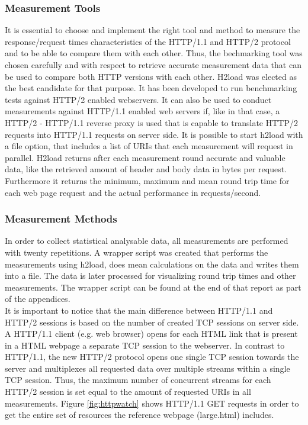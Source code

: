 \subsubsection{Measurement Tools}
It is essential to choose and implement the right tool and method to measure the response/request times characteristics of the HTTP/1.1 and HTTP/2 protocol and to be able to compare them with each other. Thus, the bechmarking tool was chosen carefully and with respect to retrieve accurate measurement data that can be used to compare both HTTP versions with each other. 
H2load \cite{h2load} was elected as the best candidate for that purpose. It has been developed to run benchmarking tests against HTTP/2 enabled webservers. 
It can also be used to conduct measurements against HTTP/1.1 enabled web servers if, like in that case, a HTTP/2 - HTTP/1.1 reverse proxy is used that is capable to translate HTTP/2 requests into HTTP/1.1 requests on server side. 
It is possible to start h2load with a file option, that includes a list of URIs that each measurement will request in parallel. H2load returns after each measurement round accurate and valuable data, like the retrieved  amount of header and body data in bytes per request. Furthermore it returns the minimum, maximum and mean round trip time for each web page request and the actual performance in requests/second. 
\\
\subsubsection{Measurement Methods}
In order to collect statistical analysable data, all measurements are performed with twenty repetitions. A wrapper script was created that performs the measurements using h2load, does mean calculations on the data and writes them into a file. The data is later processed for visualizing round trip times and other measurements. The wrapper script can be found at the end of that report as part of the appendices. 
\\
It is important to notice that the main difference between HTTP/1.1 and HTTP/2 sessions is based on the number of created TCP sessions on server side. A HTTP/1.1 client (e.g. web browser) opens for each HTML link that is present in a HTML webpage a separate TCP session to the webserver. In contrast to HTTP/1.1, the new HTTP/2 protocol opens one single TCP session towards the server and multiplexes all requested data over multiple streams within a single TCP session. Thus, the maximum number of concurrent streams for each HTTP/2 session is set equal to the amount of requested URIs in all measurements. Figure \ref{fig:httpwatch} shows HTTP/1.1 GET requests in order to get the entire set of resources the reference webpage (large.html) includes.


